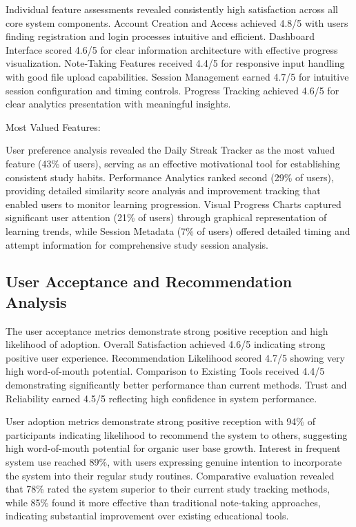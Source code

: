 {Individual feature assessments revealed consistently high satisfaction across all core system components. Account Creation and Access achieved 4.8/5 with users finding registration and login processes intuitive and efficient. Dashboard Interface scored 4.6/5 for clear information architecture with effective progress visualization. Note-Taking Features received 4.4/5 for responsive input handling with good file upload capabilities. Session Management earned 4.7/5 for intuitive session configuration and timing controls. Progress Tracking achieved 4.6/5 for clear analytics presentation with meaningful insights.

{\color{maroon}
Most Valued Features:

User preference analysis revealed the Daily Streak Tracker as the most valued feature (43\% of users), serving as an effective motivational tool for establishing consistent study habits. Performance Analytics ranked second (29\% of users), providing detailed similarity score analysis and improvement tracking that enabled users to monitor learning progression. Visual Progress Charts captured significant user attention (21\% of users) through graphical representation of learning trends, while Session Metadata (7\% of users) offered detailed timing and attempt information for comprehensive study session analysis.
}

\subsection{User Acceptance and Recommendation Analysis}

The user acceptance metrics demonstrate strong positive reception and high likelihood of adoption. Overall Satisfaction achieved 4.6/5 indicating strong positive user experience. Recommendation Likelihood scored 4.7/5 showing very high word-of-mouth potential. Comparison to Existing Tools received 4.4/5 demonstrating significantly better performance than current methods. Trust and Reliability earned 4.5/5 reflecting high confidence in system performance.

{\color{maroon}
User adoption metrics demonstrate strong positive reception with 94\% of participants indicating likelihood to recommend the system to others, suggesting high word-of-mouth potential for organic user base growth. Interest in frequent system use reached 89\%, with users expressing genuine intention to incorporate the system into their regular study routines. Comparative evaluation revealed that 78\% rated the system superior to their current study tracking methods, while 85\% found it more effective than traditional note-taking approaches, indicating substantial improvement over existing educational tools.
}


}
